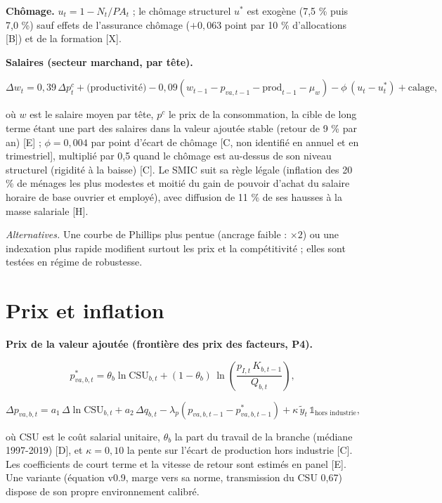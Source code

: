 \documentclass[
  11pt,
  11pt,
  a4paper,
  openany]{book}
\begin{document}
\textbf{Chômage.} \(u_t = 1 - N_t / PA_t\) ; le chômage structurel
\(u^*\) est exogène (7,5 \% puis 7,0 \%) sauf effets de l'assurance
chômage (\(+0{,}063\) point par 10 \% d'allocations {[}B{]}) et de la
formation {[}X{]}.

\textbf{Salaires (secteur marchand, par tête).}

\[\Delta w_t = 0{,}39\,\Delta p^c_t + \text{(productivité)} - 0{,}09\left(w_{t-1} - p_{va,t-1} - \text{prod}_{t-1} - \mu_w\right) - \phi\,(u_t - u^*_t) + \text{calage},\]

où \(w\) est le salaire moyen par tête, \(p^c\) le prix de la
consommation, la cible de long terme étant une part des salaires dans la
valeur ajoutée stable (retour de 9 \% par an) {[}E{]} ;
\(\phi = 0{,}004\) par point d'écart de chômage {[}C, non identifié en
annuel et en trimestriel{]}, multiplié par 0,5 quand le chômage est
au-dessus de son niveau structurel (rigidité à la baisse) {[}C{]}. Le
SMIC suit sa règle légale (inflation des 20 \% de ménages les plus
modestes et moitié du gain de pouvoir d'achat du salaire horaire de base
ouvrier et employé), avec diffusion de 11 \% de ses hausses à la masse
salariale {[}H{]}.

\emph{Alternatives.} Une courbe de Phillips plus pentue (ancrage faible
: \(\times 2\)) ou une indexation plus rapide modifient surtout les prix
et la compétitivité ; elles sont testées en régime de robustesse.

\hypertarget{sec:eq-prix}{%
\section{Prix et inflation}\label{sec:eq-prix}}

\textbf{Prix de la valeur ajoutée (frontière des prix des facteurs,
P4).}

\[p^{*}_{va,b,t} = \theta_b \ln \text{CSU}_{b,t} + (1-\theta_b)\,\ln\left(\frac{p_{I,t}\,K_{b,t-1}}{Q_{b,t}}\right),\]

\[\Delta p_{va,b,t} = a_1\,\Delta \ln \text{CSU}_{b,t} + a_2\,\Delta q_{b,t} - \lambda_p\left(p_{va,b,t-1} - p^*_{va,b,t-1}\right) + \kappa\,\tilde y_t\,\mathbb{1}_{\text{hors industrie}},\]

où CSU est le coût salarial unitaire, \(\theta_b\) la part du travail de
la branche (médiane 1997-2019) {[}D{]}, et \(\kappa = 0{,}10\) la pente
sur l'écart de production hors industrie {[}C{]}. Les coefficients de
court terme et la vitesse de retour sont estimés en panel {[}E{]}. Une
variante (équation v0.9, marge vers sa norme, transmission du CSU 0,67)
dispose de son propre environnement calibré.
\end{document}

